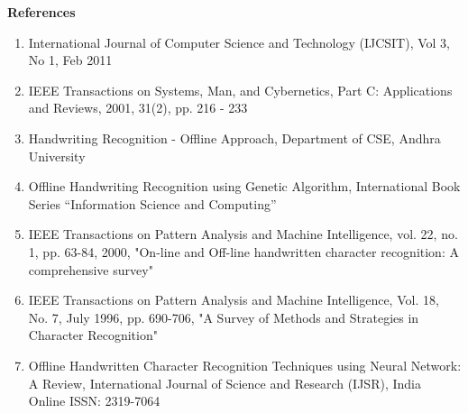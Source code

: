 \documentclass[main.tex]{subfiles}
\begin{document}
\begin{flushleft}
\Large{\bf{References}}
\end{flushleft}
\vspace{1.5mm}
\justify
\begin{enumerate}
	\item International Journal of Computer Science and Technology (IJCSIT), Vol
		3, No 1, Feb 2011
	\item IEEE Transactions on Systems, Man, and Cybernetics, Part C: 
		Applications and Reviews, 2001, 31(2), pp. 216 - 233
	\item Handwriting Recognition - Offline Approach, Department of CSE, Andhra
		University
	\item Offline Handwriting Recognition using Genetic Algorithm, International
		Book Series “Information Science and Computing”
	\item IEEE Transactions on Pattern Analysis and Machine Intelligence, vol. 
		22, no. 1, pp. 63-84, 2000, "On-line and Off-line handwritten character
		recognition: A comprehensive survey"
	\item IEEE Transactions on Pattern Analysis and Machine Intelligence, Vol. 
		18, No. 7, July 1996, pp. 690-706, "A Survey of Methods and Strategies 
		in Character Recognition"
	\item Offline Handwritten Character Recognition Techniques using Neural 
		Network: A Review, International Journal of Science and Research (IJSR),
		India Online ISSN: 2319-7064
\end{enumerate}
\end{document}
